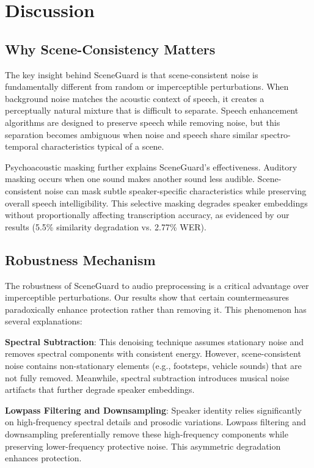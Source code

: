 \section{Discussion}

\subsection{Why Scene-Consistency Matters}

The key insight behind SceneGuard is that scene-consistent noise is fundamentally different from random or imperceptible perturbations. When background noise matches the acoustic context of speech, it creates a perceptually natural mixture that is difficult to separate. Speech enhancement algorithms are designed to preserve speech while removing noise, but this separation becomes ambiguous when noise and speech share similar spectro-temporal characteristics typical of a scene.

Psychoacoustic masking further explains SceneGuard's effectiveness. Auditory masking occurs when one sound makes another sound less audible. Scene-consistent noise can mask subtle speaker-specific characteristics while preserving overall speech intelligibility. This selective masking degrades speaker embeddings without proportionally affecting transcription accuracy, as evidenced by our results (5.5\% similarity degradation vs. 2.77\% WER).

\subsection{Robustness Mechanism}

The robustness of SceneGuard to audio preprocessing is a critical advantage over imperceptible perturbations. Our results show that certain countermeasures paradoxically enhance protection rather than removing it. This phenomenon has several explanations:

\textbf{Spectral Subtraction}: This denoising technique assumes stationary noise and removes spectral components with consistent energy. However, scene-consistent noise contains non-stationary elements (e.g., footsteps, vehicle sounds) that are not fully removed. Meanwhile, spectral subtraction introduces musical noise artifacts that further degrade speaker embeddings.

\textbf{Lowpass Filtering and Downsampling}: Speaker identity relies significantly on high-frequency spectral details and prosodic variations. Lowpass filtering and downsampling preferentially remove these high-frequency components while preserving lower-frequency protective noise. This asymmetric degradation enhances protection.

